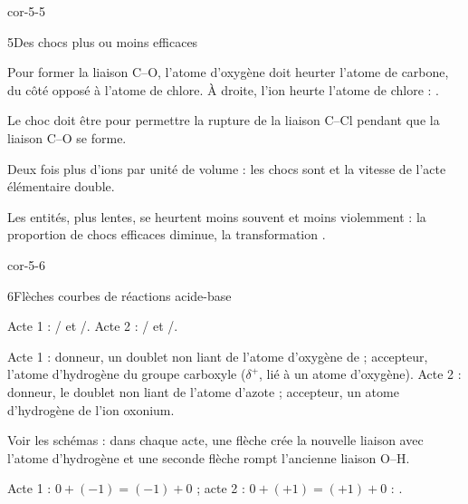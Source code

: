 \begin{blocLivre}{cor-5-5}
\begin{corrige}{5}{Des chocs plus ou moins efficaces}
\begin{questions}
\item Pour former la liaison C--O, l'atome d'oxygène doit heurter l'atome de carbone, du côté opposé à l'atome de
chlore. À droite, l'ion heurte l'atome de chlore : .
\item Le choc doit être  pour permettre la rupture de la liaison C--Cl pendant
que la liaison C--O se forme.
\item Deux fois plus d'ions par unité de volume : les chocs sont  et la vitesse
de l'acte élémentaire double.
\item Les entités, plus lentes, se heurtent moins souvent et moins violemment : la proportion de chocs efficaces
diminue, la transformation .
\end{questions}
\end{corrige}
\end{blocLivre}
\begin{blocLivre}{cor-5-6}
\begin{corrige}{6}{Flèches courbes de réactions acide-base}
\begin{questions}
\item Acte 1 : / et /. Acte 2 : / et /.
\item Acte 1 : donneur, un doublet non liant de l'atome d'oxygène de  ; accepteur, l'atome d'hydrogène du
groupe carboxyle ($\delta^+$, lié à un atome d'oxygène). Acte 2 : donneur, le doublet non liant de l'atome d'azote ;
accepteur, un atome d'hydrogène de l'ion oxonium.
\item Voir les schémas : dans chaque acte, une flèche crée la nouvelle liaison avec l'atome d'hydrogène et une
seconde flèche rompt l'ancienne liaison O--H.
\item Acte 1 : $0+(-1)=(-1)+0$ ; acte 2 : $0+(+1)=(+1)+0$ : .
\end{questions}
\end{corrige}
\end{blocLivre}
